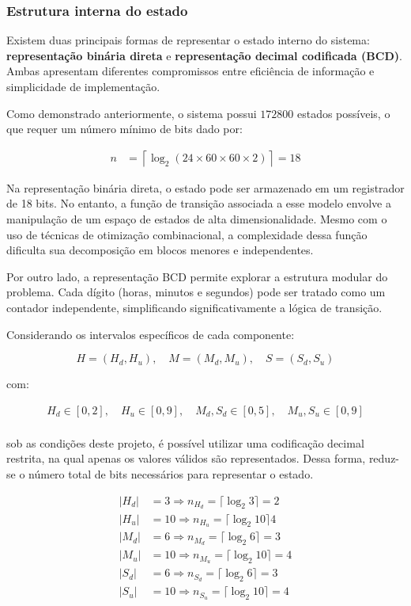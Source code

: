 \subsubsection{Estrutura interna do estado}

Existem duas principais formas de representar o estado interno do sistema: \textbf{representação binária direta} e \textbf{representação decimal codificada (BCD)}. 
Ambas apresentam diferentes compromissos entre eficiência de informação e simplicidade de implementação.

Como demonstrado anteriormente, o sistema possui $172800$ estados possíveis, o que requer um número mínimo de bits dado por:

\begin{align*}
n &= \left\lceil \log_2(24 \times 60 \times 60 \times 2) \right\rceil = 18
\end{align*}

Na representação binária direta, o estado pode ser armazenado em um registrador de 18 bits. No entanto, a função de transição associada a esse modelo envolve a manipulação de um espaço de estados de alta dimensionalidade. Mesmo com o uso de técnicas de otimização combinacional, a complexidade dessa função dificulta sua decomposição em blocos menores e independentes.

Por outro lado, a representação BCD permite explorar a estrutura modular do problema. Cada dígito (horas, minutos e segundos) pode ser tratado como um contador independente, simplificando significativamente a lógica de transição.

Considerando os intervalos específicos de cada componente:

\[
H = (H_d, H_u), \quad M = (M_d, M_u), \quad S = (S_d, S_u)
\]

com:

\begin{align*}
H_d \in [0,2], \quad H_u \in [0,9], \quad M_d, S_d \in [0,5], \quad M_u, S_u \in [0,9]\\
\end{align*}

sob as condições deste projeto, é possível utilizar uma codificação decimal restrita, na qual apenas os valores válidos são representados. Dessa forma, reduz-se o número total de bits necessários para representar o estado.

\begin{align*}
    |H_d| &= 3  \Rightarrow n_{H_d} = \lceil \log_2 3 \rceil = 2 \\
    |H_u| &= 10 \Rightarrow n_{H_u} = \lceil \log_2 10\rceil  4 \\
    |M_d| &= 6  \Rightarrow n_{M_d} = \lceil \log_2 6 \rceil = 3 \\
    |M_u| &= 10 \Rightarrow n_{M_u} = \lceil \log_2 10\rceil = 4 \\
    |S_d| &= 6  \Rightarrow n_{S_d} = \lceil \log_2 6 \rceil = 3 \\
    |S_u| &= 10 \Rightarrow n_{S_u} = \lceil \log_2 10\rceil = 4
\end{align*}

